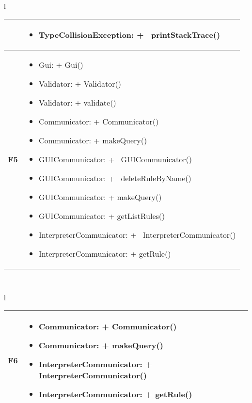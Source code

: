 \large{
\begin{tabular}{l}
\begin{tabular}{||p{2cm}||p{10cm}||} \hline
\textbf{} & 
\begin{itemize}
\item TypeCollisionException: +~ printStackTrace()
\end{itemize} \\ \hline
\textbf{F5} &
\begin{itemize}
\item Gui: + Gui()
\item Validator: + Validator()
\item Validator: + validate()
\item Communicator: + Communicator()
\item Communicator: + makeQuery()
\item GUICommunicator: +~ GUICommunicator()
\item GUICommunicator: +~ deleteRuleByName()
\item GUICommunicator: + makeQuery()
\item GUICommunicator: + getListRules()
\item InterpreterCommunicator: +~ InterpreterCommunicator()
\item InterpreterCommunicator: + getRule()
\end{itemize} \\ \hline
\end{tabular} \\
\end{tabular}


\large{
\begin{tabular}{l}

\begin{tabular}{||p{2cm}||p{10cm}||} \hline
\textbf{F6} & 
\begin{itemize}

\item Communicator: + Communicator()
\item Communicator: + makeQuery()
\item InterpreterCommunicator: +~ InterpreterCommunicator()
\item InterpreterCommunicator: + getRule()
\end{itemize} \\ \hline


\end{tabular}
\end{tabular}}}
